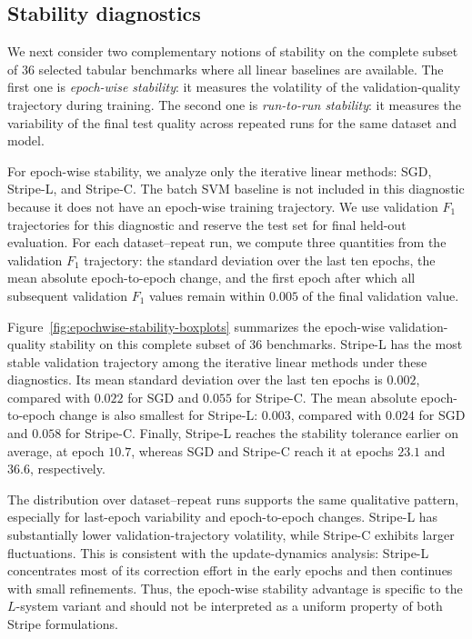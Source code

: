 \documentclass[a4paper,fleqn]{cas-sc}
\begin{document}
\subsection{Stability diagnostics}
\label{subsec:stability-diagnostics}

We next consider two complementary notions of stability on the complete subset
of $36$ selected tabular benchmarks where all linear baselines are available.
The first one is \emph{epoch-wise stability}: it measures the volatility of the
validation-quality trajectory during training. The second one is
\emph{run-to-run stability}: it measures the variability of the final test
quality across repeated runs for the same dataset and model.

For epoch-wise stability, we analyze only the iterative linear methods: SGD,
Stripe-L, and Stripe-C. The batch SVM baseline is not included in this
diagnostic because it does not have an epoch-wise training trajectory. We use
validation $F_1$ trajectories for this diagnostic and reserve the test set for
final held-out evaluation. For each dataset--repeat run, we compute three
quantities from the validation $F_1$ trajectory: the standard deviation over
the last ten epochs, the mean absolute epoch-to-epoch change, and the first
epoch after which all subsequent validation $F_1$ values remain within $0.005$
of the final validation value.

Figure~\ref{fig:epochwise-stability-boxplots} summarizes the epoch-wise
validation-quality stability on this complete subset of $36$ benchmarks.
Stripe-L has the most stable validation trajectory among the iterative linear
methods under these diagnostics. Its mean standard deviation over the last ten
epochs is $0.002$, compared with $0.022$ for SGD and $0.055$ for Stripe-C. The
mean absolute epoch-to-epoch change is also smallest for Stripe-L: $0.003$,
compared with $0.024$ for SGD and $0.058$ for Stripe-C. Finally, Stripe-L
reaches the stability tolerance earlier on average, at epoch $10.7$, whereas
SGD and Stripe-C reach it at epochs $23.1$ and $36.6$, respectively.

The distribution over dataset--repeat runs supports the same qualitative
pattern, especially for last-epoch variability and epoch-to-epoch changes.
Stripe-L has substantially lower validation-trajectory volatility, while
Stripe-C exhibits larger fluctuations. This is consistent with the
update-dynamics analysis: Stripe-L concentrates most of its correction effort
in the early epochs and then continues with small refinements. Thus, the
epoch-wise stability advantage is specific to the $L$-system variant and should
not be interpreted as a uniform property of both Stripe formulations.
\end{document}

